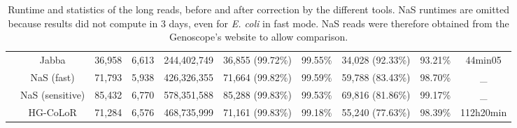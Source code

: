 \documentclass[long, final]{jobim2017}
\begin{document}
\begin{table}[ht]
\begin{center}
{\begin{tabular}{|c|c|c|c|c|c|c|c|c|c|}
		& Jabba & 36,958 & 6,613 & 244,402,749 & 36,855 (99.72\%) & 99.55\% & 34,028 (92.33\%) & 93.21\% & 44min05 \\
		& NaS (fast) & 71,793 & 5,938 & 426,326,355 & 71,664 (99.82\%) & 99.59\% & 59,788 (83.43\%) & 98.70\% & \_ \\
		& NaS (sensitive) & 85,432 & 6,770 & 578,351,588 & 85,288 (99.83\%) & 99.53\% & 69,816 (81.86\%) & 99.17\% & \_ \\
		& HG-CoLoR & 71,284 & 6,576 & 468,735,999 & 71,161 (99.83\%) & 99.18\% & 55,240 (77.63\%) & 98.39\% & 112h20min \\
		\hline
	\end{tabular}
	}
	\end{center}
	\caption{Runtime and statistics of the long reads, before and after correction by the different tools. 
	NaS runtimes are omitted because results did not compute in 3 days, even for \emph{E. coli} in fast mode. NaS reads 
	were therefore obtained from the Genoscope's website to allow comparison.
	\label{tabid}}
	
\end{table}
\end{document}
